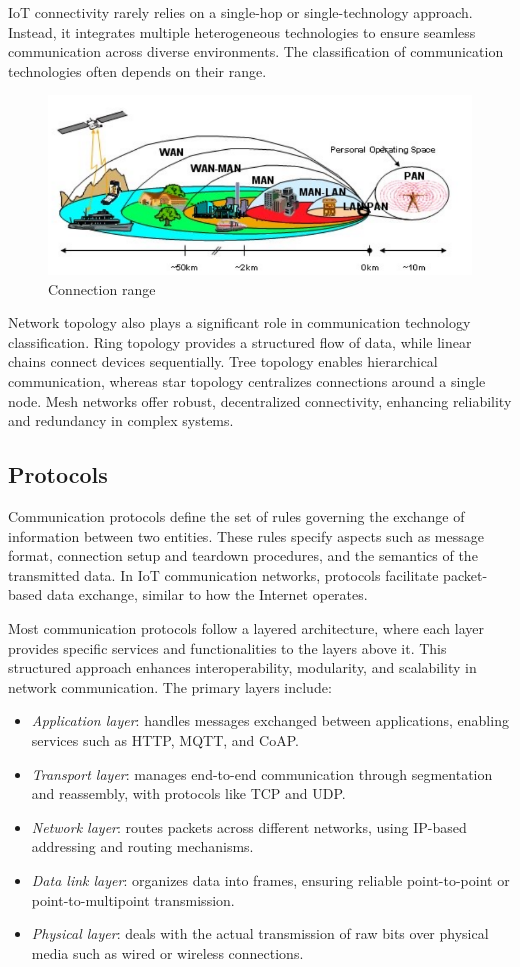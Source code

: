 IoT connectivity rarely relies on a single-hop or single-technology approach. 
Instead, it integrates multiple heterogeneous technologies to ensure seamless communication across diverse environments. 
The classification of communication technologies often depends on their range.
\begin{figure}[H]
    \centering
    \includegraphics[width=0.5\linewidth]{images/net.png}
    \caption{Connection range}
\end{figure}
Network topology also plays a significant role in communication technology classification. 
Ring topology provides a structured flow of data, while linear chains connect devices sequentially. 
Tree topology enables hierarchical communication, whereas star topology centralizes connections around a single node. 
Mesh networks offer robust, decentralized connectivity, enhancing reliability and redundancy in complex systems.

\subsection{Protocols}
Communication protocols define the set of rules governing the exchange of information between two entities. 
These rules specify aspects such as message format, connection setup and teardown procedures, and the semantics of the transmitted data. 
In IoT communication networks, protocols facilitate packet-based data exchange, similar to how the Internet operates.

Most communication protocols follow a layered architecture, where each layer provides specific services and functionalities to the layers above it. 
This structured approach enhances interoperability, modularity, and scalability in network communication. The primary layers include:
\begin{itemize}
    \item \textit{Application layer}: handles messages exchanged between applications, enabling services such as HTTP, MQTT, and CoAP.
    \item \textit{Transport layer}: manages end-to-end communication through segmentation and reassembly, with protocols like TCP and UDP.
    \item \textit{Network layer}: routes packets across different networks, using IP-based addressing and routing mechanisms.
    \item \textit{Data link layer}: organizes data into frames, ensuring reliable point-to-point or point-to-multipoint transmission.
    \item \textit{Physical layer}: deals with the actual transmission of raw bits over physical media such as wired or wireless connections.
\end{itemize}